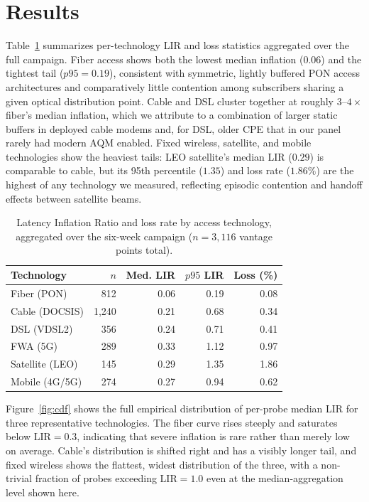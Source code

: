 \section{Results}
\label{sec:results}
Table~\ref{tab:results} summarizes per-technology LIR and loss statistics aggregated over
the full campaign. Fiber access shows both the lowest median inflation ($0.06$) and the
tightest tail ($p95 = 0.19$), consistent with symmetric, lightly buffered PON access
architectures and comparatively little contention among subscribers sharing a given
optical distribution point. Cable and DSL cluster together at roughly $3$--$4\times$
fiber's median inflation, which we attribute to a combination of larger static buffers in
deployed cable modems and, for DSL, older CPE that in our panel rarely had modern AQM
enabled. Fixed wireless, satellite, and mobile technologies show the heaviest tails: LEO
satellite's median LIR ($0.29$) is comparable to cable, but its 95th percentile ($1.35$)
and loss rate ($1.86\%$) are the highest of any technology we measured, reflecting
episodic contention and handoff effects between satellite beams.

\begin{table}[t]
\centering
\footnotesize
\caption{Latency Inflation Ratio and loss rate by access technology, aggregated over the
six-week campaign ($n = 3{,}116$ vantage points total).}
\label{tab:results}
\begin{tabular}{@{}lrrrr@{}}
\toprule
\textbf{Technology} & \textbf{$n$} & \textbf{Med. LIR} & \textbf{$p95$ LIR} & \textbf{Loss (\%)} \\
\midrule
Fiber (PON)     & 812   & 0.06 & 0.19 & 0.08 \\
Cable (DOCSIS)  & 1{,}240 & 0.21 & 0.68 & 0.34 \\
DSL (VDSL2)     & 356   & 0.24 & 0.71 & 0.41 \\
FWA (5G)        & 289   & 0.33 & 1.12 & 0.97 \\
Satellite (LEO) & 145   & 0.29 & 1.35 & 1.86 \\
Mobile (4G/5G)  & 274   & 0.27 & 0.94 & 0.62 \\
\bottomrule
\end{tabular}
\end{table}

Figure~\ref{fig:cdf} shows the full empirical distribution of per-probe median LIR for
three representative technologies. The fiber curve rises steeply and saturates below
$\mathrm{LIR}=0.3$, indicating that severe inflation is rare rather than merely
low on average. Cable's distribution is shifted right and has a visibly longer tail,
and fixed wireless shows the flattest, widest distribution of the three, with a
non-trivial fraction of probes exceeding $\mathrm{LIR}=1.0$ even at the median-aggregation
level shown here.

